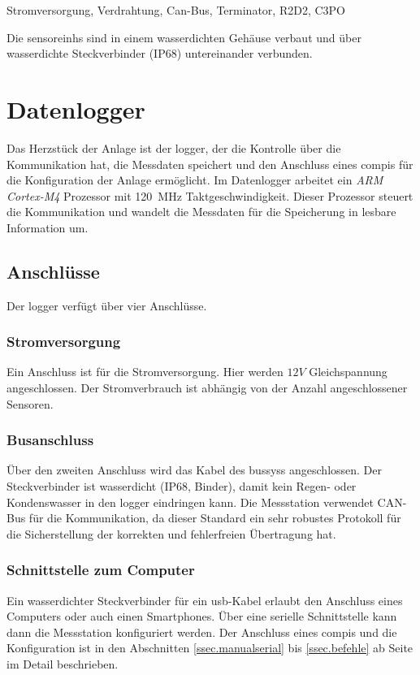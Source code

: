 
Stromversorgung, Verdrahtung, Can-Bus, Terminator, R2D2, C3PO

Die \glspl{sensoreinh} sind in einem wasserdichten Gehäuse verbaut und über wasserdichte Steckverbinder (IP68) untereinander verbunden. 










\section{Datenlogger}\label{sec.manuallogger}
Das Herzstück der Anlage ist der \gls{logger}, der die Kontrolle über die Kommunikation hat, die Messdaten speichert und den Anschluss eines \gls{compi}s für die Konfiguration der Anlage ermöglicht. Im Datenlogger arbeitet ein \emph{ARM Cortex-M4} Prozessor mit 120~MHz Taktgeschwindigkeit. Dieser Prozessor steuert die Kommunikation und wandelt die Messdaten für die Speicherung in lesbare Information um.

\subsection{Anschlüsse}
Der \gls{logger} verfügt über vier Anschlüsse. 

\subsubsection{Stromversorgung}
Ein Anschluss ist für die Stromversorgung. Hier werden \ensuremath{12 V} Gleichspannung angeschlossen. Der Stromverbrauch ist abhängig von der Anzahl angeschlossener Sensoren.

\subsubsection{Busanschluss}
Über den zweiten Anschluss wird das Kabel des \gls{bussys}s angeschlossen. Der Steckverbinder ist wasserdicht (IP68, Binder), damit kein Regen- oder Kondenswasser in den \gls{logger} eindringen kann. Die Messstation verwendet CAN-Bus für die Kommunikation, da dieser Standard ein sehr robustes Protokoll für die Sicherstellung der korrekten und fehlerfreien Übertragung hat. 

\subsubsection{Schnittstelle zum Computer}
Ein wasserdichter Steckverbinder für ein \gls{usb}-Kabel erlaubt den Anschluss eines Computers oder auch einen Smartphones. Über eine serielle Schnittstelle kann dann die Messstation konfiguriert werden. Der Anschluss eines \gls{compi}s und die Konfiguration ist in den Abschnitten \ref{ssec.manualserial} bis \ref{ssec.befehle} ab Seite \pageref{ssec.manualserial} im Detail beschrieben.

